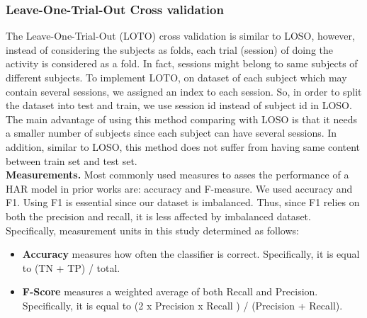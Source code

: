 \documentclass[journal,article,submit,moreauthors,pdftex]{Definitions/mdpi}
\begin{document}
\subsubsection{Leave-One-Trial-Out Cross validation}
The Leave-One-Trial-Out (LOTO) cross validation is similar to LOSO, however, instead of considering the subjects as folds, each trial (session) of doing the activity is considered as a fold. In fact, sessions might belong to same subjects of different subjects. To implement LOTO, on dataset of each subject which may contain several sessions, we assigned an index to each session. So, in order to split the dataset into test and train, we use session id instead of subject id in LOSO. The main advantage of using this method comparing with LOSO is that it needs a smaller number of subjects since each subject can have several sessions. In addition, similar to LOSO, this method does not suffer from having same content between train set and test set.\\

\noindent \textbf{Measurements.} Most commonly used measures to asses the performance of a HAR model in prior works are: accuracy\cite{brownlee2018gentle,zhang2011feature,mehrang2017human} and F-measure\cite{rosati2018comparison,Nourani_CoMoRea2019}. We used accuracy and F1. Using F1 is essential since our dataset is imbalanced. Thus, since F1 relies on both the precision and recall, it is less affected by imbalanced dataset. Specifically, measurement units in this study determined as follows:
\begin{itemize}
	\item \noindent \textbf{Accuracy} measures how often the classifier is correct. Specifically, it is equal to (TN + TP) / total.
	\item \noindent \textbf{F-Score} measures a weighted average of both Recall and Precision. Specifically, it is equal to (2 x Precision x Recall ) / (Precision + Recall). 
\end{itemize}
\end{document}
